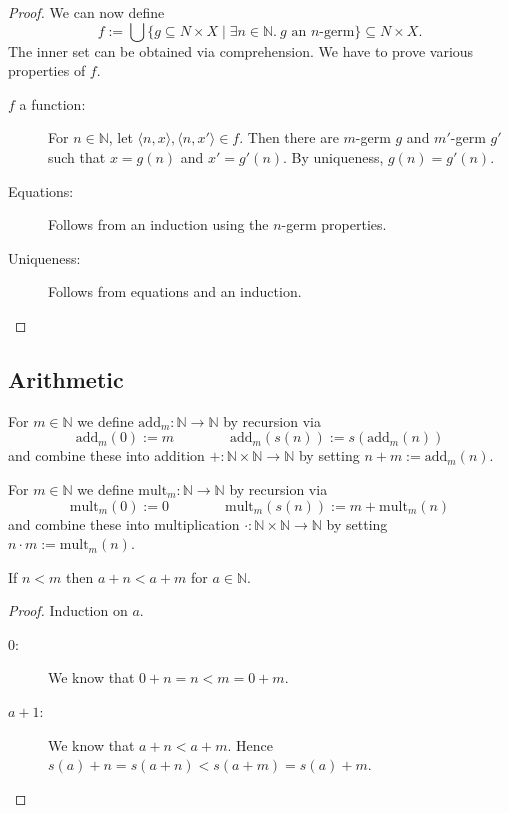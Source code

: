 \documentclass{whrartcl}
\newcommand{\NN}{\mathbb{N}}
\begin{document}
\begin{proof}
  We can now define
  \[
    f := \bigcup \{g \subseteq N \times X \mid \exists n \in \NN.~ g \text{ an }
    n\text{-germ}\} \subseteq N \times X.
  \]
  The inner set can be obtained via comprehension.
  We have to prove various properties of $f$.
  \begin{description}
  \item[$f$ a function:] For $n \in \NN$, let $\langle n, x \rangle, \langle n,
    x' \rangle \in f$. Then there are $m$-germ $g$ and $m'$-germ $g'$ such that
    $x = g(n)$ and $x' = g'(n)$. By uniqueness, $g(n) = g'(n)$.
  \item[Equations:] Follows from an induction using the $n$-germ properties.
  \item[Uniqueness:] Follows from equations and an induction.
  \end{description}
\end{proof}

\subsection{Arithmetic}

\begin{definition}
  For $m \in \NN$ we define $\text{add}_m : \NN \to \NN$ by recursion via
  \[
    \text{add}_m(0) := m \qquad \qquad \text{add}_m(s(n)) := s(\text{add}_m(n))
  \]
  and combine these into addition $+ : \NN \times \NN \to \NN$ by setting $n + m
  := \text{add}_m(n)$.

  For $m \in \NN$ we define $\text{mult}_m : \NN \to \NN$ by recursion via
  \[
    \text{mult}_m(0) := 0 \qquad \qquad \text{mult}_m(s(n)) := m + \text{mult}_m(n)
  \]
  and combine these into multiplication $\cdot : \NN \times \NN \to \NN$ by setting $n \cdot m
  := \text{mult}_m(n)$.
\end{definition}

\begin{lemma}
  If $n < m$ then $a + n < a + m$ for $a \in \NN$.
\end{lemma}
\begin{proof}
  Induction on $a$.
  \begin{description}
  \item[$0$:] We know that $0 + n = n < m = 0 + m$.
  \item[$a + 1$:] We know that $a + n < a + m$. Hence $s(a) + n = s(a + n) < s(a +
    m) = s(a) + m$.
  \end{description}
\end{proof}
\end{document}
